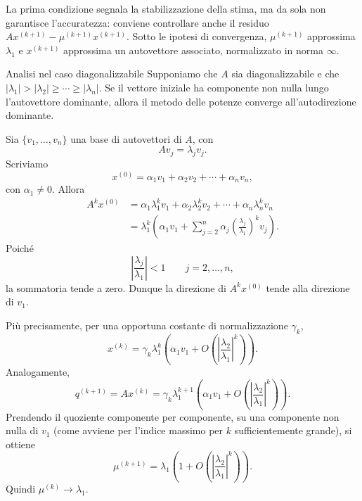 \documentclass[a4paper]{article}
\begin{document}
La prima condizione segnala la stabilizzazione della stima, ma da sola non garantisce l'accuratezza: conviene controllare anche il residuo \(Ax^{(k+1)}-\mu^{(k+1)}x^{(k+1)}\). Sotto le ipotesi di convergenza, \(\mu^{(k+1)}\) approssima \(\lambda_1\) e \(x^{(k+1)}\) approssima un autovettore associato, normalizzato in norma \(\infty\).

\begin{snippetproposition}{Analisi nel caso diagonalizzabile}
    Supponiamo che \(A\) sia diagonalizzabile e che \(|\lambda_1|>|\lambda_2|\geq\cdots\geq |\lambda_n|\). Se il vettore iniziale ha componente non nulla lungo l'autovettore dominante, allora il metodo delle potenze converge all'autodirezione dominante.
\end{snippetproposition}

\begin{snippetproof}{}
    Sia \(\{v_1,
    \ldots,v_n\}\) una base di autovettori di \(A\), con
    \[
        Av_j=\lambda_j v_j.
    \]
    Scriviamo
    \[
        x^{(0)}=\alpha_1v_1+
        \alpha_2v_2+
        \cdots+
        \alpha_nv_n,
    \]
    con \(\alpha_1\neq 0\). Allora
    \begin{align*}
        A^k x^{(0)}
        &=
        \alpha_1\lambda_1^k v_1+
        \alpha_2\lambda_2^k v_2+
        \cdots+
        \alpha_n\lambda_n^k v_n\\
        &=
        \lambda_1^k\left(
            \alpha_1v_1+
            \sum_{j=2}^n \alpha_j\left(\frac{\lambda_j}{\lambda_1}\right)^k v_j
        \right).
    \end{align*}
    Poiché
    \[
        \left|\frac{\lambda_j}{\lambda_1}\right|<1
        \qquad j=2,
        \ldots,n,
    \]
    la sommatoria tende a zero. Dunque la direzione di \(A^k x^{(0)}\) tende alla direzione di \(v_1\).

    Più precisamente, per una opportuna costante di normalizzazione \(\gamma_k\),
    \[
        x^{(k)}
        =
        \gamma_k\lambda_1^k\left(
            \alpha_1v_1+O\left(\left|\frac{\lambda_2}{\lambda_1}\right|^k\right)
        \right).
    \]
    Analogamente,
    \[
        q^{(k+1)}=Ax^{(k)}
        =
        \gamma_k\lambda_1^{k+1}\left(
            \alpha_1v_1+O\left(\left|\frac{\lambda_2}{\lambda_1}\right|^k\right)
        \right).
    \]
    Prendendo il quoziente componente per componente, su una componente non nulla di \(v_1\) (come avviene per l'indice massimo per \(k\) sufficientemente grande), si ottiene
    \[
        \mu^{(k+1)}
        =
        \lambda_1\left(
            1+O\left(\left|\frac{\lambda_2}{\lambda_1}\right|^k\right)
        \right).
    \]
    Quindi \(\mu^{(k)}\to\lambda_1\).
\end{snippetproof}
\end{document}
